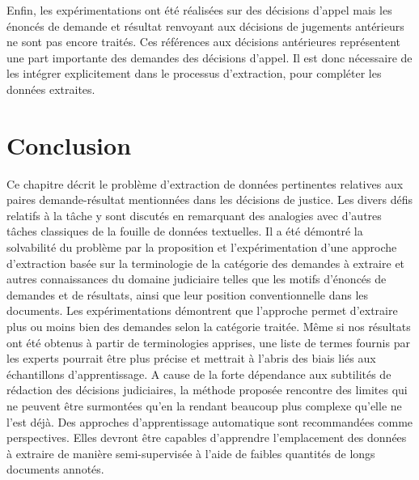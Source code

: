 Enfin, les expérimentations ont été réalisées sur des décisions d'appel mais les énoncés de demande et résultat renvoyant aux décisions de jugements antérieurs ne sont pas encore traités. Ces références aux décisions antérieures représentent une part importante des demandes des décisions d'appel. Il est donc nécessaire de les intégrer explicitement dans le processus d'extraction, pour compléter les données extraites.

\section{Conclusion}
\label{sec:quanta:conclusion}
Ce chapitre décrit le problème d'extraction de données pertinentes relatives aux paires demande-résultat mentionnées dans les décisions de justice. Les divers défis relatifs à la tâche y sont discutés en remarquant des analogies avec d'autres tâches classiques de la fouille de données textuelles. Il a été démontré la solvabilité du problème par la proposition et l'expérimentation d'une approche d'extraction basée sur la terminologie de la catégorie des demandes à extraire et autres connaissances du domaine judiciaire telles que les motifs d'énoncés de demandes et de résultats, ainsi que leur position conventionnelle dans les documents. Les expérimentations démontrent que l'approche permet d'extraire plus ou moins bien des demandes selon la catégorie traitée. Même si nos résultats ont été obtenus à partir de terminologies apprises, une liste de termes fournis par les experts pourrait être plus précise et mettrait à l'abris des biais liés aux échantillons d'apprentissage. A cause de la forte dépendance aux subtilités de rédaction des décisions judiciaires, la méthode proposée rencontre des limites qui ne peuvent être surmontées qu'en la rendant beaucoup plus complexe qu'elle ne l'est déjà. Des approches d'apprentissage automatique sont recommandées comme perspectives. Elles devront être capables d'apprendre l'emplacement des données à extraire de manière semi-supervisée à l'aide de faibles quantités de longs documents annotés.
